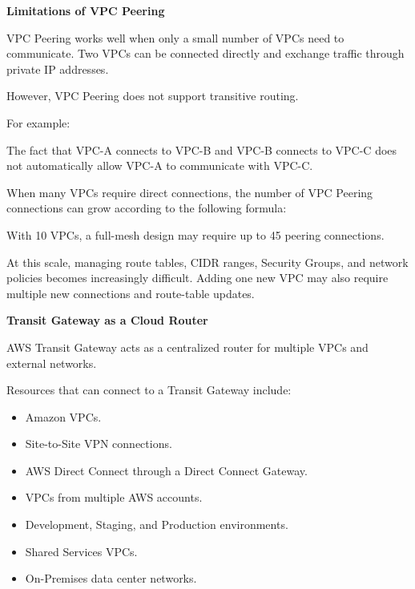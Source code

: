\vspace{0.5em}\noindent\textbf{Limitations of VPC
Peering}\par

VPC Peering works well when only a small number of VPCs need to
communicate. Two VPCs can be connected directly and exchange traffic
through private IP addresses.

However, VPC Peering does not support transitive routing.

For example:

\begin{Shaded}
\begin{Highlighting}[]
\end{Highlighting}
\end{Shaded}

The fact that VPC-A connects to VPC-B and VPC-B connects to VPC-C does
not automatically allow VPC-A to communicate with VPC-C.

When many VPCs require direct connections, the number of VPC Peering
connections can grow according to the following formula:

\begin{Shaded}
\begin{Highlighting}[]
\end{Highlighting}
\end{Shaded}

With 10 VPCs, a full-mesh design may require up to 45 peering
connections.

At this scale, managing route tables, CIDR ranges, Security Groups, and
network policies becomes increasingly difficult. Adding one new VPC may
also require multiple new connections and route-table updates.

\vspace{0.5em}\noindent\textbf{Transit Gateway as a Cloud
Router}\par

AWS Transit Gateway acts as a centralized router for multiple VPCs and
external networks.

Resources that can connect to a Transit Gateway include:

\begin{itemize}
\tightlist
\item
  Amazon VPCs.
\item
  Site-to-Site VPN connections.
\item
  AWS Direct Connect through a Direct Connect Gateway.
\item
  VPCs from multiple AWS accounts.
\item
  Development, Staging, and Production environments.
\item
  Shared Services VPCs.
\item
  On-Premises data center networks.
\end{itemize}

